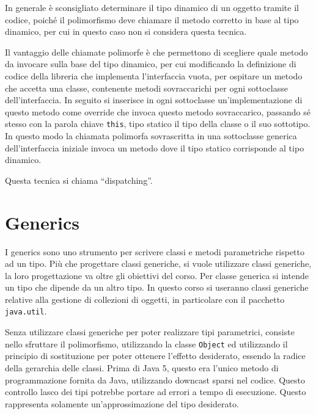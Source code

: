 \documentclass{article}
\numberwithin{equation}{subsection}
\begin{document}
In generale è sconsigliato determinare il tipo dinamico di un oggetto tramite il codice, poiché il polimorfismo deve chiamare il metodo corretto in base al tipo dinamico, per 
cui in questo caso non si considera questa tecnica. 

Il vantaggio delle chiamate polimorfe è che permettono di scegliere quale metodo da invocare sulla base del tipo dinamico, per cui modificando la definizione di codice della 
libreria che implementa l'interfaccia vuota, per ospitare un metodo che accetta una classe, contenente metodi sovraccarichi per ogni sottoclasse dell'interfaccia. 
In seguito si inserisce in ogni sottoclasse un'implementazione di questo metodo come override che invoca questo metodo sovraccarico, passando sé stesso con la parola chiave 
\verb|this|, tipo statico il tipo della classe o il suo sottotipo. In questo modo la chiamata polimorfa sovrascritta in una sottoclasse generica dell'interfaccia iniziale 
invoca un metodo dove il tipo statico corrisponde al tipo dinamico. 


Questa tecnica si chiama ``dispatching''. 

\clearpage

\section{Generics}

I generics sono uno strumento per scrivere classi e metodi parametriche rispetto ad un tipo. Più che progettare classi generiche, si vuole utilizzare classi generiche, la loro 
progettazione va oltre gli obiettivi del corso. Per classe generica si intende un tipo che dipende da un altro tipo. In questo corso si useranno classi generiche relative 
alla gestione di collezioni di oggetti, in particolare con il pacchetto \verb|java.util|. 

Senza utilizzare classi generiche per poter realizzare tipi parametrici, consiste nello sfruttare il polimorfismo, utilizzando la classe \verb|Object| ed utilizzando il 
principio di sostituzione per poter ottenere l'effetto desiderato, essendo la radice della gerarchia delle classi. Prima di Java 5, questo era l'unico metodo di programmazione 
fornita da Java, utilizzando downcast sparsi nel codice. Questo controllo lasco dei tipi potrebbe portare ad errori a tempo di esecuzione. 
Questo rappresenta solamente un'approssimazione del tipo desiderato. 
\end{document}

